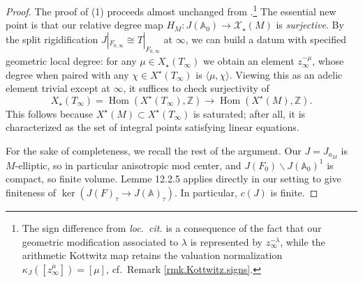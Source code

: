 \documentclass[openany]{amsbook}
\theoremstyle{definition}
\theoremstyle{remark}
\numberwithin{equation}{section}
\newcommand{\Z}{\mathbb{Z}}
\newcommand{\cX}{\mathcal{X}}
\newcommand{\A}{\mathbb{A}}
\renewcommand{\-}{\operatorname{-}}
\newcommand{\Hom}{\operatorname{Hom}}
\renewcommand{\A}{\mathbb{A}}
\begin{document}
\begin{proof}
    The proof of (1) proceeds almost unchanged from \cite[Proposition 12.2.2]{CLII}.\footnote{The sign difference from \textit{loc.\ cit.} is a consequence of the fact that our geometric modification associated to $\lambda$ is represented by $z_\infty^{-\lambda}$, while the arithmetic Kottwitz map retains the valuation normalization $\kappa_J([z_\infty^\mu]) = [\mu]$, cf.\ Remark \ref{rmk.Kottwitz.signs}.} The essential new point is that our relative degree map $H_M : J(\A_0) \to \cX_\star(M)$ is \emph{surjective}. By the split rigidification $J|_{F_{0,\infty}} \cong T|_{F_{0, \infty}}$ at $\infty$, we can build a datum with specified geometric local degree: for any $\mu \in X_\star(T_\infty)$ we obtain an element $z_\infty^{-\mu}$, whose degree when paired with any $\chi \in X^\star(T_\infty)$ is $\langle \mu, \chi\rangle$. Viewing this as an adelic element trivial except at $\infty$, it suffices to check surjectivity of 
    $$
        X_\star(T_\infty) = \Hom(X^\star(T_\infty), \Z) \to \Hom(X^\star(M), \Z).
    $$
    This follows because $X^\star(M) \subset X^\star(T_\infty)$ is saturated; after all, it is characterized as the set of integral points satisfying linear equations.
    
    For the sake of completeness, we recall the rest of the argument. Our $J = J_{a_M}$ is $M$-elliptic, so in particular anisotropic mod center, and $J(F_0)\backslash J(\A_0)^1$ is compact, so finite volume. Lemme 12.2.5 applies directly in our setting to give finiteness of $\ker(J(F)_\tau \to J(\A)_\tau)$. In particular, $c(J)$ is finite. 


\end{proof}
\end{document}
